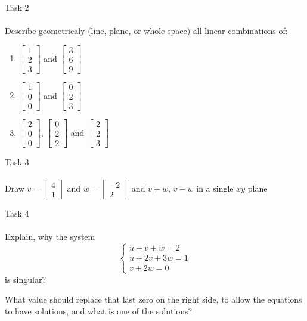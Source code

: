 \documentclass[aspectratio=169]{beamer}
\begin{document}
\begin{frame}[t]{Task 2}
\framesubtitle{}
    Describe geometricaly (line, plane, or whole space) all linear combinations of:
        \begin{enumerate}
            \item $\begin{bmatrix}1 \\ 2 \\3 \end{bmatrix}$ and $\begin{bmatrix}3 \\ 6 \\9 \end{bmatrix}$
            \item $\begin{bmatrix}1 \\ 0 \\0 \end{bmatrix}$ and $\begin{bmatrix}0 \\ 2 \\3 \end{bmatrix}$
            \item $\begin{bmatrix}2 \\ 0 \\0 \end{bmatrix}$, $\begin{bmatrix}0 \\ 2 \\2 \end{bmatrix}$ and $\begin{bmatrix}2 \\ 2 \\3 \end{bmatrix}$
        \end{enumerate}
\end{frame}

\begin{frame}[c]{Task 3}
\framesubtitle{}
    Draw $v = \begin{bmatrix}4 \\1 \end{bmatrix}$ and $w = \begin{bmatrix}-2 \\ 2 \end{bmatrix}$ and $ v + w $, $v-w$ in a single $xy$ plane
\end{frame}

\begin{frame}[t, label=task4]{Task 4}
\framesubtitle{}
    Explain, why the system
    \begin{equation*}
    \left\{\begin{matrix}
        u + v + w = 2 \\ 
        u + 2v + 3w = 1 \\ 
        v + 2w = 0 
        \end{matrix}\right.
    \end{equation*}
    is singular?

    What value should replace that last zero on the right side, to allow the equations to have solutions, and what is one of the solutions?
\end{frame}
\end{document}
